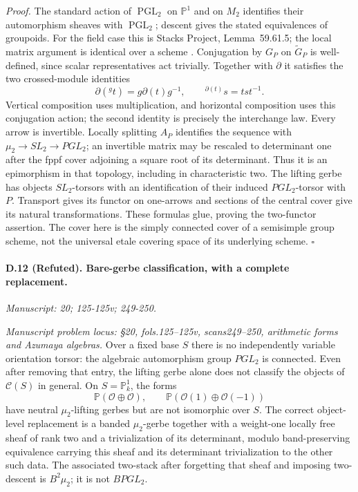 \emph{Proof.} The standard action of $\operatorname{PGL}_2$ on $\mathbb P^1$ and on $M_2$ identifies their automorphism sheaves with $\operatorname{PGL}_2$; descent gives the stated equivalences of groupoids. For the field case this is Stacks Project, Lemma~59.61.5; the local matrix argument is identical over a scheme \citep{StacksBrauer}. Conjugation by $G_P$ on $\widetilde G_P$ is well-defined, since scalar representatives act trivially. Together with $\partial$ it satisfies the two crossed-module identities
\[
\partial({}^{g}t)=g\partial(t)g^{-1},\qquad
{}^{\partial(t)}s=tst^{-1}.
\]
Vertical composition uses multiplication, and horizontal composition uses this conjugation action; the second identity is precisely the interchange law. Every arrow is invertible. Locally splitting $A_P$ identifies the sequence with $\mu_2\to SL_2\to PGL_2$; an invertible matrix may be rescaled to determinant one after the fppf cover adjoining a square root of its determinant. Thus it is an epimorphism in that topology, including in characteristic two. The lifting gerbe has objects $SL_2$-torsors with an identification of their induced $PGL_2$-torsor with $P$. Transport gives its functor on one-arrows and sections of the central cover give its natural transformations. These formulas glue, proving the two-functor assertion. The cover here is the simply connected cover of a semisimple group scheme, not the universal etale covering space of its underlying scheme. \hfill$\square$

\paragraph{D.12 (Refuted). Bare-gerbe classification, with a complete replacement.}
\textit{Manuscript: 20; 125-125v; 249-250.}

\emph{Manuscript problem locus: \S20, fols.125--125v, scans249--250, arithmetic forms and Azumaya algebras.}
Over a fixed base $S$ there is no independently variable orientation torsor: the algebraic automorphism group $PGL_2$ is connected. Even after removing that entry, the lifting gerbe alone does not classify the objects of $\mathcal C(S)$ in general. On $S=\mathbb P^1_k$, the forms
\[
\mathbb P(\mathcal O\oplus\mathcal O),\qquad
\mathbb P(\mathcal O(1)\oplus\mathcal O(-1))
\]
have neutral $\mu_2$-lifting gerbes but are not isomorphic over $S$. The correct object-level replacement is a banded $\mu_2$-gerbe together with a weight-one locally free sheaf of rank two and a trivialization of its determinant, modulo band-preserving equivalence carrying this sheaf and its determinant trivialization to the other such data. The associated two-stack after forgetting that sheaf and imposing two-descent is $B^2\mu_2$; it is not $BPGL_2$.

